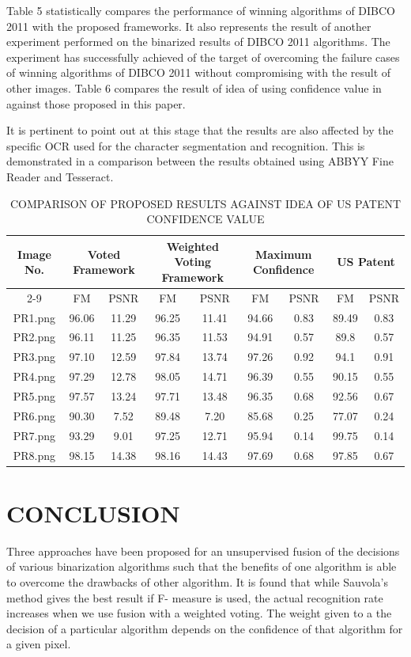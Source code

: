 \documentclass[conference]{IEEEtran}
\begin{document}
Table 5 statistically compares the performance of winning algorithms of DIBCO 2011\cite{gatos2011icdar} with the proposed frameworks. It also represents the result of another experiment performed on the binarized results of DIBCO 2011\cite{dibco2011results} algorithms. The experiment has successfully achieved of the target of overcoming the failure cases of winning algorithms of DIBCO 2011 without compromising with the result of other images. Table 6 compares the result of idea of using confidence value in \cite{uspatent} against those proposed in this paper.

It is pertinent to point out at this stage that the results are also affected by the specific OCR used for the character segmentation and recognition. This is demonstrated in a comparison between the results obtained using ABBYY Fine Reader and Tesseract.

\begin{table}[!t]
\caption{COMPARISON OF PROPOSED RESULTS AGAINST IDEA OF US PATENT CONFIDENCE VALUE \cite{uspatent}}
\centering
\footnotesize
\begin{tabular}{|c|c|c|c|c|c|c|c|c|}
\hline
\multirow{2}{*}{Image No.} & \multicolumn{2}{c|}{Voted Framework} & \multicolumn{2}{c|}{Weighted Voting Framework} & \multicolumn{2}{c|}{Maximum Confidence} & \multicolumn{2}{c|}{US Patent} \\
\cline{2-9}
 & FM & PSNR & FM & PSNR & FM & PSNR & FM & PSNR \\
\hline
PR1.png & 96.06 & 11.29 & 96.25 & 11.41 & 94.66 & 0.83 & 89.49 & 0.83 \\
PR2.png & 96.11 & 11.25 & 96.35 & 11.53 & 94.91 & 0.57 & 89.8 & 0.57 \\
PR3.png & 97.10 & 12.59 & 97.84 & 13.74 & 97.26 & 0.92 & 94.1 & 0.91 \\
PR4.png & 97.29 & 12.78 & 98.05 & 14.71 & 96.39 & 0.55 & 90.15 & 0.55 \\
PR5.png & 97.57 & 13.24 & 97.71 & 13.48 & 96.35 & 0.68 & 92.56 & 0.67 \\
PR6.png & 90.30 & 7.52 & 89.48 & 7.20 & 85.68 & 0.25 & 77.07 & 0.24 \\
PR7.png & 93.29 & 9.01 & 97.25 & 12.71 & 95.94 & 0.14 & 99.75 & 0.14 \\
PR8.png & 98.15 & 14.38 & 98.16 & 14.43 & 97.69 & 0.68 & 97.85 & 0.67 \\
\hline
\end{tabular}
\label{tab:uspatent}
\end{table}

\section{CONCLUSION}
Three approaches have been proposed for an unsupervised fusion of the decisions of various binarization algorithms such that the benefits of one algorithm is able to overcome the drawbacks of other algorithm. It is found that while Sauvola's method gives the best result if F- measure is used, the actual recognition rate increases when we use fusion with a weighted voting. The weight given to a the decision of a particular algorithm depends on the confidence of that algorithm for a given pixel.
\end{document}

